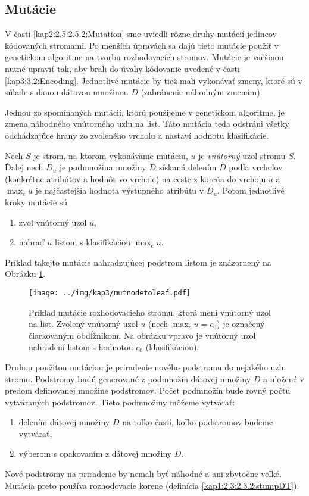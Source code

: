 \subsection{Mutácie}\label{kap3:3.4:3.4.2:Mutation}
V časti \ref{kap2:2.5:2.5.2:Mutation} sme uviedli rôzne druhy mutácií jedincov kódovaných stromami. Po menších úpravách sa dajú tieto mutácie použiť v genetickom algoritme na tvorbu rozhodovacích stromov. Mutácie je väčšinou nutné upraviť tak, aby brali do úvahy kódovanie uvedené v časti \ref{kap3:3.2:Encoding}. Jednotlivé mutácie by tiež mali vykonávať zmeny, ktoré sú v súlade s danou dátovou množinou $D$ (zabránenie náhodným zmenám).

Jednou zo spomínaných mutácií, ktorú použijeme v genetickom algoritme, je zmena náhodného vnútorného uzlu na list. Táto mutácia teda odstráni všetky odchádzajúce hrany zo zvoleného vrcholu a nastaví hodnotu klasifikácie.

Nech $S$ je strom, na ktorom vykonávame mutáciu, $u$ je \emph{vnútorný} uzol stromu $S$. Ďalej nech $D_u$ je podmnožina množiny $D$ získaná delením $D$ podľa vrcholov (konkrétne atribútov a hodnôt vo vrchole) na ceste z koreňa do vrcholu $u$ a $\max_c u$ je najčastejšia hodnota výstupného atribútu v $D_u$. Potom jednotlivé kroky mutácie sú
\begin{enumerate}
\item zvoľ vnútorný uzol $u$,
\item nahraď $u$ listom s klasifikáciou $\max_c u$.
\end{enumerate}
Príklad takejto mutácie nahradzujúcej podstrom listom je znázornený na Obrázku \ref{fig:mutnodetoleaf}.

\begin{figure}[h]
\centering
\centerline{\mbox{\texttt{[image: ../img/kap3/mutnodetoleaf.pdf]}}}
\caption{Príklad mutácie rozhodovacieho stromu, ktorá mení vnútorný uzol na list. Zvolený vnútorný uzol $u$ (nech $\max_c u = c_0$) je označený čiarkovaným obdĺžnikom. Na obrázku vpravo je vnútorný uzol nahradení listom s hodnotou $c_0$ (klasifikáciou).}\label{fig:mutnodetoleaf}
\end{figure}

Druhou použitou mutáciou je priradenie nového podstromu do nejakého uzlu stromu. Podstromy budú generované z podmnožín dátovej množiny $D$ a uložené v predom definovanej množine podstromov. Počet podmnožín bude rovný počtu vytváraných podstromov. Tieto podmnožiny môžeme vytvárať:
\begin{enumerate}
\item delením dátovej množiny $D$ na toľko častí, koľko podstromov budeme vytvárať,
\item výberom s opakovaním z dátovej množiny $D$.
\end{enumerate}
Nové podstromy na priradenie by nemali byť náhodné a ani zbytočne veľké. Mutácia preto používa rozhodovacie korene (definícia \ref{kap1:2.3:2.3.2:stumpDT}).

